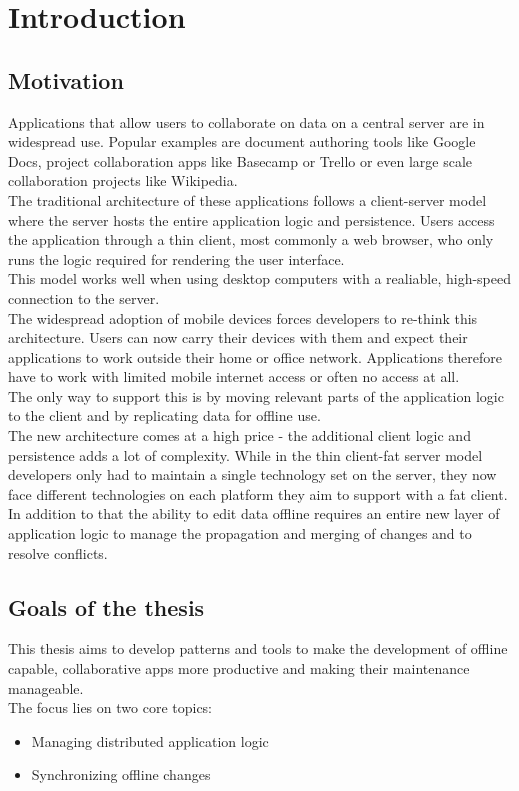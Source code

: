 
\chapter{Introduction}\label{intro}

\section{Motivation}
Applications that allow users to collaborate on data on a central server are in widespread use. Popular examples are document authoring tools like Google Docs, project collaboration apps like Basecamp or Trello or even large scale collaboration projects like Wikipedia.\\
The traditional architecture of these applications follows a client-server model where the server hosts the entire application logic and persistence. Users access the application through a thin client, most commonly a web browser, who only runs the logic required for rendering the user interface.\\
This model works well when using desktop computers with a realiable, high-speed connection to the server.\\
The widespread adoption of mobile devices forces developers to re-think this architecture. Users can now carry their devices with them and expect their applications to work outside their home or office network.
Applications therefore have to work with limited mobile internet access or often no access at all.\\
The only way to support this is by moving relevant parts of the application logic to the client and by replicating data for offline use.\\
The new architecture comes at a high price - the additional client logic and persistence adds a lot of complexity. While in the thin client-fat server model developers only had to maintain a single technology set on the server, they now face different technologies on each platform they aim to support with a fat client.\\
In addition to that the ability to edit data offline requires an entire new layer of application logic to manage the propagation and merging of changes and to resolve conflicts.\\

\section{Goals of the thesis}
This thesis aims to develop patterns and tools to make the development of offline capable, collaborative apps more productive and making their maintenance manageable.\\
The focus lies on two core topics:
\begin{itemize}
\item Managing distributed application logic
\item Synchronizing offline changes
\end{itemize}

